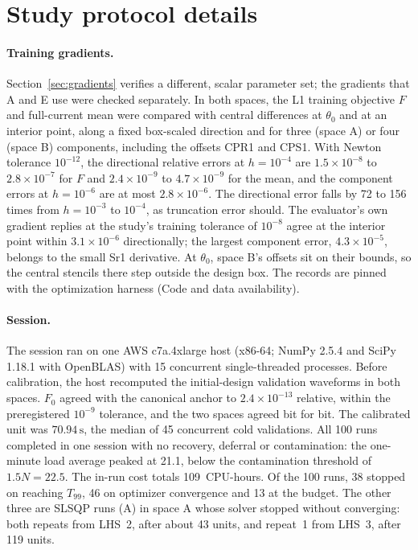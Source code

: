 \documentclass{anvil-paper}
\begin{document}
\section{Study protocol details}\label{sec:protocol-details}
\paragraph{Training gradients.}
Section~\ref{sec:gradients} verifies a different, scalar parameter set; the
gradients that A and E use were checked separately. In both spaces, the L1
training objective $F$ and full-current mean were compared with central
differences at $\theta_0$ and at an interior point, along a fixed
box-scaled direction and for three (space A) or four (space B) components,
including the offsets CPR1 and CPS1. With Newton tolerance $10^{-12}$, the
directional relative errors at $h=10^{-4}$ are $1.5\times10^{-8}$ to
$2.8\times10^{-7}$ for $F$ and $2.4\times10^{-9}$ to $4.7\times10^{-9}$ for
the mean, and the component errors at $h=10^{-6}$ are at most
$2.8\times10^{-6}$. The directional error falls by 72 to 156 times from
$h=10^{-3}$ to $10^{-4}$, as truncation error should. The evaluator's own
gradient replies at the study's training tolerance of $10^{-8}$ agree at
the interior point within $3.1\times10^{-6}$ directionally; the largest
component error, $4.3\times10^{-5}$, belongs to the small Sr1 derivative.
At $\theta_0$, space B's offsets sit on their bounds, so the central
stencils there step outside the design box. The records are pinned with the
optimization harness (Code and data availability).

\paragraph{Session.}
The session ran on one AWS c7a.4xlarge host (x86-64; NumPy 2.5.4 and
SciPy 1.18.1 with OpenBLAS) with 15 concurrent single-threaded processes.
Before calibration, the host recomputed the initial-design validation
waveforms in both spaces. $F_0$ agreed with the canonical anchor to
$2.4\times10^{-13}$ relative, within the preregistered $10^{-9}$ tolerance,
and the two spaces agreed bit for bit. The calibrated unit was
$70.94\,\mathrm{s}$, the median of 45 concurrent cold validations. All 100
runs completed in one session with no recovery, deferral or contamination:
the one-minute load average peaked at 21.1, below the contamination
threshold of $1.5N=22.5$. The in-run cost totals 109~CPU-hours. Of the
100 runs, 38 stopped on reaching $T_{99}$, 46 on optimizer convergence and
13 at the budget. The other three are SLSQP runs (A) in space A whose
solver stopped without converging: both repeats from LHS~2, after about 43
units, and repeat~1 from LHS~3, after 119 units.
\end{document}
